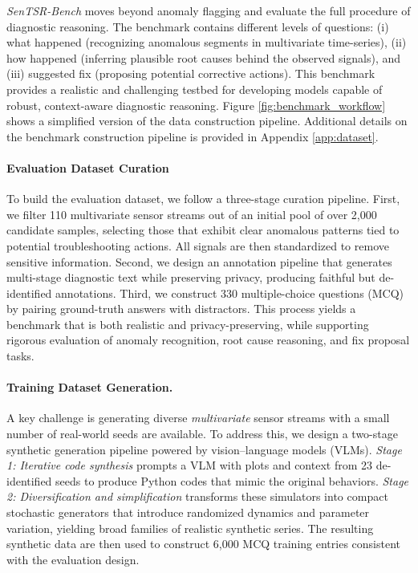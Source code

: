 \documentclass[twoside]{article}
\begin{document}
\textit{SenTSR-Bench} moves beyond anomaly flagging and evaluate the full procedure of diagnostic reasoning. The benchmark contains different levels of questions: (i) what happened (recognizing anomalous segments in multivariate time-series), (ii) how happened (inferring plausible root causes behind the observed signals), and (iii) suggested fix (proposing potential corrective actions). This benchmark provides a realistic and challenging testbed for developing models capable of robust, context-aware diagnostic reasoning. Figure \ref{fig:benchmark_workflow} shows a simplified version of the data construction pipeline. Additional details on the benchmark construction pipeline is provided in Appendix \ref{app:dataset}.

\paragraph{Evaluation Dataset Curation}
To build the evaluation dataset, we follow a three-stage curation pipeline. 
First, we filter 110 multivariate sensor streams out of an initial pool of over 2,000 candidate samples, selecting those that exhibit clear anomalous patterns tied to potential troubleshooting actions. All signals are then standardized to remove sensitive information. 
Second, we design an annotation pipeline that generates multi-stage diagnostic text while preserving privacy, producing faithful but de-identified annotations. 
Third, we construct 330 multiple-choice questions (MCQ) by pairing ground-truth answers with distractors. 
This process yields a benchmark that is both realistic and privacy-preserving, while supporting rigorous evaluation of anomaly recognition, root cause reasoning, and fix proposal tasks. 


\paragraph{Training Dataset Generation.}
A key challenge is generating diverse \textit{multivariate} sensor streams with a small number of real-world seeds are available. To address this, we design a two-stage synthetic generation pipeline powered by vision–language models (VLMs). \emph{Stage 1: Iterative code synthesis} prompts a VLM with plots and context from 23 de-identified seeds to produce Python codes that mimic the original behaviors. \emph{Stage 2: Diversification and simplification} transforms these simulators into compact stochastic generators that introduce randomized dynamics and parameter variation, yielding broad families of realistic synthetic series. The resulting synthetic data are then used to construct 6,000 MCQ training entries consistent with the evaluation design. 
\end{document}
